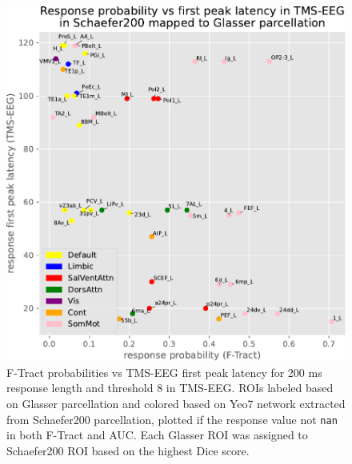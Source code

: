\begin{figure}
  \begin{center}
    \includegraphics[width=\textwidth]{images/nootebook_generated/tmseeg_ftract_responses_comparison/FP/Response_probability_vs_first_peak_latency_in_TMS-EEG_in_Schaefer200_mapped_to_Glasser_parcellation.pdf}
  \end{center}
  \caption[F-Tract probabilities vs TMS-EEG first peak latency]{F-Tract probabilities vs TMS-EEG first peak latency for 200 ms response length and threshold 8 in TMS-EEG. ROIs labeled based on Glasser parcellation and colored based on Yeo7 network extracted from Schaefer200 parcellation, plotted if the response value not \texttt{nan} in both F-Tract and AUC. Each Glasser ROI was assigned to Schaefer200 ROI based on the highest Dice score.}
  \label{fig:response_tmsFP-ftract_scatter}
\end{figure}